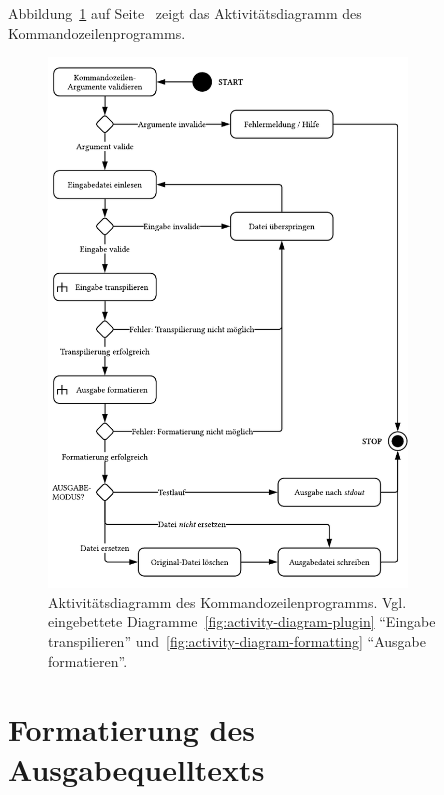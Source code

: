 


Abbildung~\ref{fig:activity-diagram-cli} auf Seite~\pageref{fig:activity-diagram-cli} zeigt das Aktivitätsdiagramm des Kommandozeilenprogramms.

\begin{figure}[tbp]
  \centering
  \includegraphics[width=0.85\textwidth]{src/4_Umsetzung/fig/activity-diagram-cli.pdf}
	\caption[Aktivitätsdiagramm des Kommandozeilenprogramms]{Aktivitätsdiagramm des Kommandozeilenprogramms. Vgl. eingebettete Diagramme~\ref{fig:activity-diagram-plugin} \enquote{Eingabe transpilieren} und~\ref{fig:activity-diagram-formatting} \enquote{Ausgabe formatieren}.}
	\label{fig:activity-diagram-cli}
\end{figure}

\section{Formatierung des Ausgabequelltexts}

